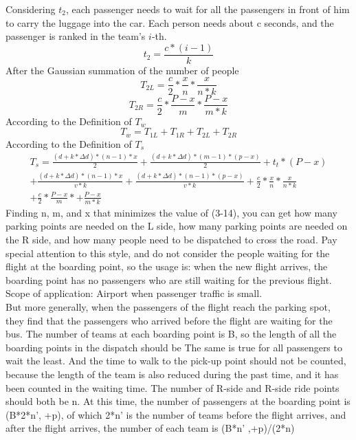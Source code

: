 Considering $t_2$, each passenger needs to wait for all the passengers in front of him to carry the luggage into the car. Each person needs about c seconds, and the passenger is ranked in the team's $i$-th.
\begin{equation} t_{2} = \frac{c*{(i-1)}}{k}\end{equation}
After the Gaussian summation of the number of people
\begin{equation} T_{2L} = \frac{c}{2}*\frac{x}{n}*\frac{x}{n*k}\end{equation}
\begin{equation} T_{2R} = \frac{c}{2}*\frac{P-x}{m}*\frac{P-x}{m*k}\end{equation}
According to the Definition of $T_w$
\begin{equation} T_{w} = T_{1L}+T_{1R}+T_{2L}+T_{2R}\end{equation}
According to the Definition of $T_s$
\begin{equation}\begin{split} T_{s} = \frac{{(d+k*\Delta d)}*{(n-1)}*{x}}{2}+\frac{{(d+k*\Delta d)}*{(m-1)}*{(p-x)}}{2}+t_t*(P-x)\\+\frac{{(d+k*\Delta d)}*{(n-1)}*x}{v*k}+\frac{{(d+k*\Delta d)}*{(n-1)}*(p-x)}{v*k}+\frac{c}{2}*\frac{x}{n}*\frac{x}{n*k}\\+\frac{c}{2}*\frac{P-x}{m}*+\frac{P-x}{m*k}\end{split}\end{equation}
Finding n, m, and x that minimizes the value of (3-14), you can get how many parking points are needed on the L side, how many parking points are needed on the R side, and how many people need to be dispatched to cross the road.
Pay special attention to this style, and do not consider the people waiting for the flight at the boarding point, so the usage is: when the new flight arrives, the boarding point has no passengers who are still waiting for the previous flight.
Scope of application: Airport when passenger traffic is small.\\
But more generally, when the passengers of the flight reach the parking spot, they find that the passengers who arrived before the flight are waiting for the bus. The number of teams at each boarding point is B, so the length of all the boarding points in the dispatch should be The same is true for all passengers to wait the least. And the time to walk to the pick-up point should not be counted, because the length of the team is also reduced during the past time, and it has been counted in the waiting time. The number of R-side and R-side ride points should both be n. At this time, the number of passengers at the boarding point is (B*2*n', +p), of which 2*n' is the number of teams before the flight arrives, and after the flight arrives, the number of each team is (B*n' ,+p)/(2*n) 

